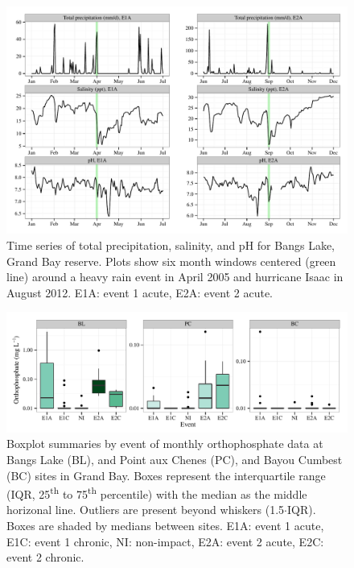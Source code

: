 \documentclass[letterpaper,12pt]{article}\usepackage[]{graphicx}\usepackage[]{color}
\makeatletter
\def\maxwidth{ %
  \ifdim\Gin@nat@width>\linewidth
    \linewidth
  \else
    \Gin@nat@width
  \fi
}
\makeatother
\begin{document}
\begin{figure}[!ht]

{\centering \includegraphics[width=\maxwidth]{figs/tsplotexp-1} 

}

\caption[Time series of total precipitation, salinity, and pH for Bangs Lake, Grand Bay reserve]{Time series of total precipitation, salinity, and pH for Bangs Lake, Grand Bay reserve.  Plots show six month windows centered (green line) around a heavy rain event in April 2005 and hurricane Isaac in August 2012.  E1A: event 1 acute, E2A: event 2 acute.}\label{fig:tsplotexp}
\end{figure}


\clearpage

\begin{figure}[!ht]

{\centering \includegraphics[width=\maxwidth]{figs/orthfig-1} 

}

\caption[Boxplot summaries by event of monthly orthophosphate data at Bangs Lake (BL), and Point aux Chenes (PC), and Bayou Cumbest (BC) sites in Grand Bay]{Boxplot summaries by event of monthly orthophosphate data at Bangs Lake (BL), and Point aux Chenes (PC), and Bayou Cumbest (BC) sites in Grand Bay.  Boxes represent the interquartile range (IQR, 25\textsuperscript{th} to 75\textsuperscript{th} percentile) with the median as the middle horizonal line.  Outliers are present beyond whiskers (1.5$\cdot$IQR). Boxes are shaded by medians between sites.  E1A: event 1 acute, E1C: event 1 chronic, NI: non-impact, E2A: event 2 acute, E2C: event 2 chronic.}\label{fig:orthfig}
\end{figure}
\end{document}
